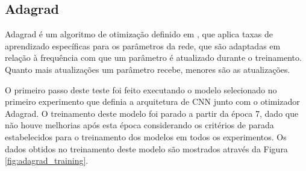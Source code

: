 \documentclass[
	12pt,				%
	oneside,			%
	a4paper,			%
	english,			%
	brazil				%
	]{abntex2ppgsi}
\begin{document}
\subsection{Adagrad}
Adagrad é um algoritmo de otimização definido em , que aplica taxas de aprendizado específicas para os parâmetros da rede, que são adaptadas em relação à frequência com que um parâmetro é atualizado durante o treinamento. Quanto mais atualizações um parâmetro recebe, menores são as atualizações.

O primeiro passo deste teste foi feito executando o modelo selecionado no primeiro experimento que definia a arquitetura de CNN junto com o otimizador Adagrad. O treinamento deste modelo foi parado a partir da época 7, dado que não houve melhorias após esta época considerando os critérios de parada estabelecidos para o treinamento dos modelos em todos os experimentos. Os dados obtidos no treinamento deste modelo são mostrados através da Figura \ref{fig:adagrad_training}.
\end{document}
